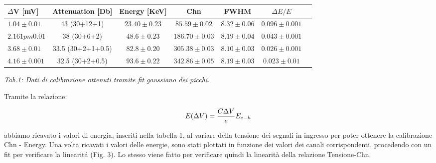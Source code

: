 \documentclass[a4paper]{article}
\begin{document}
	
\begin{center} 
		
		\begin{tabular}{lcccccc}
			\hline
			\hline
			\textbf{ $\Delta$V} [mV]   &   \textbf{Attenuation} [Db]  	& \textbf{Energy} [KeV]  &  \textbf{Chn}  &   \textbf{FWHM} & \textbf{$\Delta E/E$}\\
			\hline
			\hline
				      $1.04\pm0.01  $    & 43	(30+12+1)  &     $23.40\pm0.23$		        &   $85.59\pm0.02$	&	$8.32\pm0.06  $ & $0.096\pm0.001$	\\
				     $  2.16 1pm0.01$                  &  38 (30+6+2) &         $48.6\pm0.23$   			&	$186.70\pm0.03$  &	$8.19\pm0.04$ &  $0.043\pm0.001$  \\
				       $3.68	\pm0.01  $ 	        &  33.5 (30+2+1+0.5) &        $82.8	\pm0.20$		    & 	$305.38\pm0.03$  &   $8.10\pm0.03$     & $0.026\pm0.001$   \\
				       $4.16	\pm0.001$ 	        & 32.5 (30+2+0.5) &        	  $93.6\pm0.22		$        & 	$342.86\pm0.05$ 	& 	$8.19\pm0.03 $    & $0.023\pm0.01 $ \\
			
			\hline
			\hline
		\end{tabular}
		\linebreak
		\emph{Tab.1: Dati di calibrazione ottenuti tramite fit gaussiano dei picchi.} 
	\end{center}

Tramite la relazione:

     \begin{equation}
     E(\Delta V) = {{C\Delta V}\over{e}} E_{e-h} 
     \end{equation}

abbiamo ricavato i valori di energia, inseriti nella tabella 1, al variare della tensione dei segnali in ingresso per poter ottenere la calibrazione Chn - Energy. 
Una volta ricavati i valori delle energie, sono stati plottati in funzione dei valori dei canali corrispondenti, procedendo con un fit per verificare la linearit\'a (Fig. 3). Lo stesso viene fatto per verificare quindi la linearità della relazione Tensione-Chn.
\newpage
\end{document}
